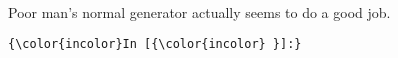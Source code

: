 \documentclass[11pt]{article}
\begin{document}
    \begin{center}
    \end{center}
    { \hspace*{\fill} \\}
    
    Poor man's normal generator actually seems to do a good job.

    \begin{Verbatim}[commandchars=\\\{\}]
{\color{incolor}In [{\color{incolor} }]:} 
\end{Verbatim}


    
    
    
    
\end{document}
